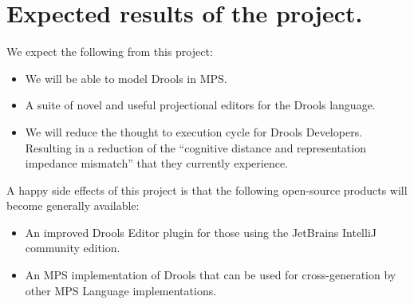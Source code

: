\section{Expected results of the project.} 

We expect the following from this project:
\begin{itemize}
    \item We will be able to model Drools in MPS.
    \item A suite of novel and useful projectional editors for the Drools language.
    \item We will reduce the thought to execution cycle for Drools Developers. Resulting in a reduction of the “cognitive distance and representation
    impedance mismatch”\cite{live_literals} that they currently experience.
\end{itemize}

A happy side effects of this project is that the following open-source products will become generally available:
\begin{itemize}
    \item An improved Drools Editor plugin for those using the JetBrains IntelliJ community edition.
	\item An MPS implementation of Drools that can be used for cross-generation by other MPS Language implementations.
\end{itemize}

